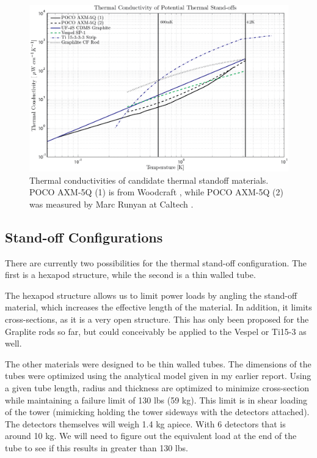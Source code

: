 \documentclass{article}
\begin{document}
\begin{figure}
\includegraphics[width = \textwidth]{Stand_off_graph.png}
\caption{Thermal conductivities of candidate thermal standoff materials. POCO AXM-5Q (1) is from Woodcraft \cite{woo:gr} , while POCO AXM-5Q (2) was measured by Marc Runyan at Caltech \cite{run}.}
\end{figure}

\subsection{Stand-off Configurations}
There are currently two possibilities for the thermal stand-off configuration. The first is a hexapod structure, while the second is a thin walled tube.

The hexapod structure allows us to limit power loads by angling the stand-off material, which increases the effective length of the material. In addition, it limits cross-sections, as it is a very open structure. This has only been proposed for the Graplite rods so far, but could conceivably be applied to the Vespel or Ti15-3 as well.

The other materials were designed to be thin walled tubes. The dimensions of the tubes were optimized using the analytical model given in my earlier report. Using a given tube length, radius and thickness are optimized to minimize cross-section while maintaining a failure limit of 130 lbs (59 kg). This limit is in shear loading of the tower (mimicking holding the tower sideways with the detectors attached). The detectors themselves will weigh 1.4 kg apiece. With 6 detectors that is around 10 kg. We will need to figure out the equivalent load at the end of the tube to see if this results in greater than 130 lbs.
\end{document}
